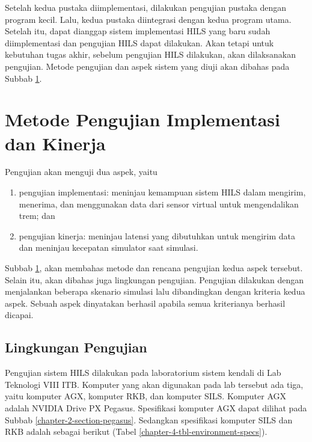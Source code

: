 Setelah kedua pustaka diimplementasi, dilakukan pengujian pustaka dengan program
kecil. Lalu, kedua pustaka diintegrasi dengan kedua program utama. Setelah itu,
dapat dianggap sistem implementasi HILS yang baru sudah diimplementasi dan
pengujian HILS dapat dilakukan. Akan tetapi untuk kebutuhan tugas akhir, sebelum
pengujian HILS dilakukan, akan dilaksanakan pengujian. Metode pengujian dan
aspek sistem yang diuji akan dibahas pada Subbab
\ref{chapter-4-testing-methodology}.

\section{Metode Pengujian Implementasi dan
  Kinerja}\label{chapter-4-testing-methodology}

Pengujian akan menguji dua aspek, yaitu
\begin{enumerate}
	\item pengujian implementasi: meninjau kemampuan sistem HILS dalam mengirim,
	      menerima, dan menggunakan data dari sensor virtual untuk
	      mengendalikan trem; dan
	\item pengujian kinerja: meninjau latensi yang dibutuhkan untuk mengirim
	      data dan meninjau kecepatan simulator saat simulasi.
\end{enumerate}
Subbab \ref{chapter-4-testing-methodology}, akan membahas metode dan rencana
pengujian kedua aspek tersebut. Selain itu, akan dibahas juga lingkungan
pengujian. Pengujian dilakukan dengan menjalankan beberapa skenario simulasi
lalu dibandingkan dengan kriteria kedua aspek. Sebuah aspek dinyatakan berhasil
apabila semua kriterianya berhasil dicapai.

\subsection{Lingkungan Pengujian}

Pengujian sistem HILS dilakukan pada laboratorium sistem kendali di Lab
Teknologi VIII ITB. Komputer yang akan digunakan pada lab tersebut ada tiga,
yaitu komputer AGX, komputer RKB, dan komputer SILS. Komputer AGX adalah NVIDIA
Drive PX Pegasus. Spesifikasi komputer AGX dapat dilihat pada Subbab
\ref{chapter-2-section-pegasus}. Sedangkan spesifikasi komputer SILS dan RKB
adalah sebagai berikut (Tabel \ref{chapter-4-tbl-environment-specs}).

